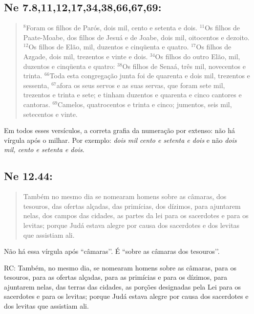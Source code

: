 \subsection*{Ne 7.8,11,12,17,34,38,66,67,69:} 
\begin{quote}
    \small
$^{\mathrm{8}}$Foram os filhos de Parós, dois mil, cento e setenta e dois. $^{\mathrm{11}}$Os filhos de Paate-Moabe, dos filhos de Jesuá e de Joabe, dois mil, oitocentos e dezoito. $^{\mathrm{12}}$Os filhos de Elão, mil, duzentos e cinqüenta e quatro. $^{\mathrm{17}}$Os filhos de Azgade, dois mil, trezentos e vinte e dois. $^{\mathrm{34}}$Os filhos do outro Elão, mil, duzentos e cinqüenta e quatro:
$^{\mathrm{38}}$Os filhos de Senaá, três mil, novecentos e trinta. $^{\mathrm{66}}$Toda esta congregação junta foi de quarenta e dois mil, trezentos e sessenta, $^{\mathrm{67}}$afora os seus servos e as suas servas, que foram sete mil, trezentos e trinta e sete; e tinham duzentos e quarenta e cinco cantores e cantoras. $^{\mathrm{69}}$Camelos, quatrocentos e trinta e cinco; jumentos, seis
mil, setecentos e vinte.
\end{quote}

Em todos esses versículos, a correta grafia da numeração por extenso:
não há vírgula após o milhar. Por exemplo: \emph{dois mil cento e
 setenta e dois} e não \emph{dois mil, cento e setenta e dois}.

\subsection*{Ne 12.44:} 
\begin{quote}
    \small
Também no mesmo dia se nomearam homens sobre as câmaras\uline{,} dos tesouros, das ofertas alçadas, das primícias, dos dízimos, para ajuntarem nelas, dos campos das cidades, as partes da lei para os sacerdotes e para os levitas; porque Judá estava alegre por causa dos sacerdotes e dos levitas que assistiam ali.
\end{quote}

Não há essa vírgula após ``câmaras’’. É ``sobre as câmaras dos tesouros’’.

RC: Também, no mesmo dia, se nomearam homens sobre as câmaras, para os tesouros, para as ofertas alçadas, para as primícias e para os dízimos, para ajuntarem nelas, das terras das cidades, as porções designadas pela Lei para os sacerdotes e para os levitas; porque Judá estava alegre por causa dos sacerdotes e dos levitas que assistiam ali.

